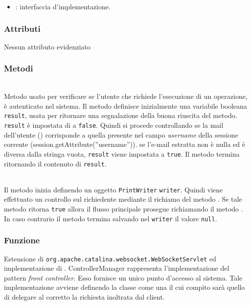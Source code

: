 \begin{itemize}
	\item {}: interfaccia d'implementazione.
\end{itemize}

\subsubsection*{Attributi}

Nessun attributo evidenziato

\subsubsection*{Metodi}

\begin{description}
	\item{}\\
	Metodo usato per verificare se l'utente che richiede l'esecuzione di un operazione, è autenticato nel sistema. Il metodo definisce inizialmente una variabile booleana \texttt{result}, usata per ritornare una segnalazione della buona riuscita del metodo. \texttt{result} è impostata di  a \texttt{false}. Quindi si procede controllando se la mail dell'utente () corrisponde a quella presente nel campo \textit{username} della sessione corrente (session.getAttribute(''username'')). se l'e-mail estratta non è nulla ed è diversa dalla stringa vuota, \texttt{result} viene impostata a \texttt{true}. Il metodo termina ritornando il contenuto di \texttt{result}.
	
	\item{}\\
	Il metodo inizia definendo un oggetto \texttt{PrintWriter} \texttt{writer}. Quindi viene effettuato un controllo sul richiedente mediante il richiamo del metodo . Se tale metodo ritorna \texttt{true} allora il flusso principale prosegue richiamando il metodo . In caso contrario il metodo termina salvando nel \texttt{writer} il valore \texttt{null}.
\end{description}


\subsubsection*{Funzione}
Estensione di \texttt{org.apache.catalina.websocket.WebSocketServlet} ed implementazione di . ControllerManager rappresenta l'implementazione del pattern \textit{front controller}. Esso fornisce un unico punto d'accesso al sistema. Tale implementazione avviene definendo la classe come una  il cui compito sarà quello di delegare al  corretto la richiesta inoltrata dal client.

